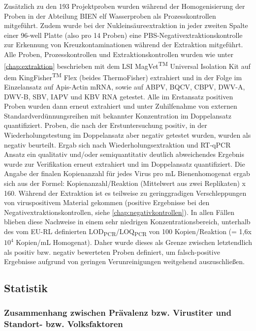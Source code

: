 Zusätzlich zu den 193 Projektproben wurden während der Homogenisierung der Proben in der Abteilung BIEN elf Wasserproben als Prozesskontrollen mitgeführt. Zudem wurde bei der Nukleinsäureextraktion in jeder zweiten Spalte einer 96-well Platte (also pro 14 Proben) eine PBS-Negativextraktionskontrolle zur Erkennung von Kreuzkontaminationen während der Extraktion mitgeführt. Alle Proben, Prozesskontrollen und Extraktionskontrollen wurden wie unter \cref{chap:extraktion} beschrieben mit dem LSI MagVet\textsuperscript{TM} Universal Isolation Kit auf dem KingFisher\textsuperscript{TM} Flex (beides ThermoFisher) extrahiert und in der Folge im Einzelansatz auf Apis-Actin mRNA, sowie auf ABPV, BQCV, CBPV, DWV-A, DWV-B, SBV, IAPV und KBV RNA getestet. Alle im Erstansatz positiven Proben wurden dann erneut extrahiert und unter Zuhilfenahme von externen Standardverdünnungsreihen mit bekannter Konzentration im Doppelansatz quantifiziert. Proben, die nach der Erstuntersuchung positiv, in der Wiederholungstestung im Doppelansatz aber negativ getestet wurden, wurden als negativ beurteilt. Ergab sich nach Wiederholungsextraktion und RT-qPCR Ansatz ein qualitativ und/oder semiquantitativ deutlich abweichendes Ergebnis wurde zur Verifikation erneut extrahiert und im Doppelansatz quantifiziert. Die Angabe der finalen Kopienanzahl für jedes Virus pro \si{\milli\liter} Bienenhomogenat ergab sich aus der Formel: Kopienanzahl/Reaktion (Mittelwert aus zwei Replikaten) x 160. Während der Extraktion ist es teilweise zu geringgradigen Verschleppungen von viruspositivem Material gekommen (positive Ergebnisse bei den Negativextraktionskontrollen, siehe \cref{chap:negativkontrollen}). In allen Fällen blieben diese Nachweise in einem sehr niedrigen Konzentrationsbereich, unterhalb des vom EU-RL definierten LOD\textsubscript{PCR}/LOQ\textsubscript{PCR} von 100 Kopien/Reaktion (= 1,6x$10^4$ Kopien/\si{\milli\liter} Homogenat). Daher wurde dieses als Grenze zwischen letztendlich als positiv bzw. negativ bewerteten Proben definiert, um falsch-positive Ergebnisse aufgrund von geringen Verunreinigungen weitgehend auszuschließen.

\subsection{Statistik}

\subsubsection{Zusammenhang zwischen Prävalenz bzw. Virustiter und Standort- bzw.
Volksfaktoren}

